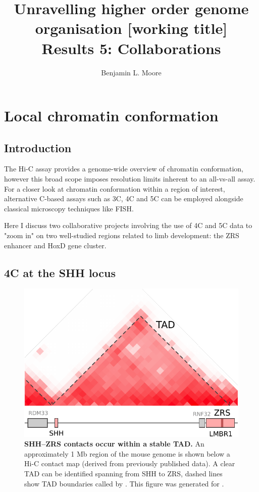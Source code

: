 \documentclass[a4paper,10pt,oneside]{book}
\title{ \vspace{3in} Unravelling higher order genome organisation {\small [working
    title]} \\ \vspace{2em} {\large {\bf Results 5: Collaborations}} }
\author{Benjamin L. Moore}
\begin{document}

\chapter{Local chromatin conformation}

\section{Introduction}

The Hi-C assay provides a genome-wide overview of chromatin conformation, however this broad scope imposes resolution limits inherent to an all-vs-all assay. For a closer look at chromatin conformation within a region of interest, alternative C-based assays such as 3C, 4C and 5C can be employed alongside classical microscopy techniques like FISH.

Here I discuss two collaborative projects involving the use of 4C and 5C data to "zoom in" on two well-studied regions related to limb development: the ZRS enhancer and HoxD gene cluster.

\section{4C at the SHH locus}

\begin{figure}
\begin{center} 
\includegraphics[width=.7\textwidth]{figs/shhtad.pdf}
\captionsetup{width=\textwidth} 
\caption[SHH--ZRS contacts occur within a stable TAD.]{ {\bf SHH--ZRS contacts occur within a stable TAD. }
An approximately 1 Mb region of the mouse genome is shown below a Hi-C contact map (derived from previously published data\cite{Dixon2012}). A clear TAD can be identified spanning from SHH to ZRS, dashed lines show TAD boundaries called by \citet{Dixon2012}. This figure was generated for \citet{Anderson2014a}.
}\label{fig:shhtad}
\end{center} 
\end{figure} 
\end{document}
